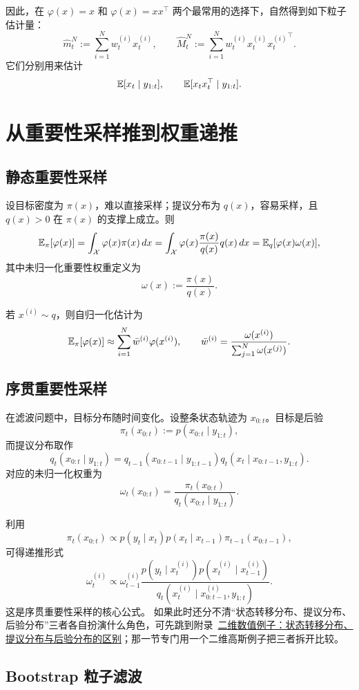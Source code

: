 \documentclass[12pt,a4paper]{ctexart}
\begin{document}
因此，在 \(\varphi(x)=x\) 和 \(\varphi(x)=xx^\top\) 两个最常用的选择下，自然得到如下粒子估计量：
\[
\widehat{m}_t^N := \sum_{i=1}^N w_t^{(i)} x_t^{(i)},
\qquad
\widehat{M}_t^N := \sum_{i=1}^N w_t^{(i)} x_t^{(i)} {x_t^{(i)}}^\top.
\]
它们分别用来估计
\[
\mathbb{E}[x_t \mid y_{1:t}],
\qquad
\mathbb{E}[x_t x_t^\top \mid y_{1:t}].
\]

\section{从重要性采样推到权重递推}

\subsection{静态重要性采样}

设目标密度为 \(\pi(x)\)，难以直接采样；提议分布为 \(q(x)\)，容易采样，且 \(q(x) > 0\) 在 \(\pi(x)\) 的支撑上成立。则
\[
\mathbb{E}_\pi[\varphi(x)]
= \int_{\mathcal X} \varphi(x)\pi(x)\,dx
= \int_{\mathcal X} \varphi(x)\frac{\pi(x)}{q(x)} q(x)\,dx
= \mathbb{E}_q[\varphi(x)\omega(x)],
\]
其中未归一化重要性权重定义为
\[
\omega(x) := \frac{\pi(x)}{q(x)}.
\]

若 \(x^{(i)} \sim q\)，则自归一化估计为
\[
\mathbb{E}_\pi[\varphi(x)]
\approx \sum_{i=1}^N \bar{w}^{(i)} \varphi(x^{(i)}),
\qquad
\bar{w}^{(i)} = \frac{\omega(x^{(i)})}{\sum_{j=1}^N \omega(x^{(j)})}.
\]

\subsection{序贯重要性采样}

在滤波问题中，目标分布随时间变化。设整条状态轨迹为 \(x_{0:t}\)。目标是后验
\[
\pi_t(x_{0:t}) := p(x_{0:t} \mid y_{1:t}),
\]
而提议分布取作
\[
q_t(x_{0:t} \mid y_{1:t})
= q_{t-1}(x_{0:t-1} \mid y_{1:t-1}) q_t(x_t \mid x_{0:t-1}, y_{1:t}).
\]
对应的未归一化权重为
\[
\omega_t(x_{0:t})
= \frac{\pi_t(x_{0:t})}{q_t(x_{0:t} \mid y_{1:t})}.
\]

利用
\[
\pi_t(x_{0:t})
\propto p(y_t \mid x_t) p(x_t \mid x_{t-1}) \pi_{t-1}(x_{0:t-1}),
\]
可得递推形式
\[
\omega_t^{(i)}
\propto \omega_{t-1}^{(i)}
\frac{p(y_t \mid x_t^{(i)}) p(x_t^{(i)} \mid x_{t-1}^{(i)})}
{q_t(x_t^{(i)} \mid x_{0:t-1}^{(i)}, y_{1:t})}.
\]
这是序贯重要性采样的核心公式。
如果此时还分不清“状态转移分布、提议分布、后验分布”三者各自扮演什么角色，可先跳到附录~\hyperref[app:proposal-2d]{二维数值例子：状态转移分布、提议分布与后验分布的区别}；那一节专门用一个二维高斯例子把三者拆开比较。

\subsection{Bootstrap 粒子滤波}
\end{document}
